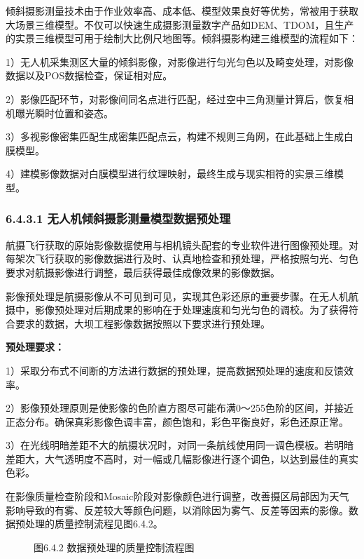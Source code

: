 倾斜摄影测量技术由于作业效率高、成本低、模型效果良好等优势，常被用于获取大场景三维模型。不仅可以快速生成摄影测量数字产品如DEM、TDOM，且生产的实景三维模型可用于绘制大比例尺地图等。倾斜摄影构建三维模型的流程如下：

1）无人机采集测区大量的倾斜影像，对影像进行匀光匀色以及畸变处理，对影像数据以及POS数据检查，保证相对应。

2）影像匹配环节，对影像间同名点进行匹配，经过空中三角测量计算后，恢复相机曝光瞬时位置和姿态。

3）多视影像密集匹配生成密集匹配点云，构建不规则三角网，在此基础上生成白膜模型。

4）建模影像数据对白膜模型进行纹理映射，最终生成与现实相符的实景三维模型。

\subsubsection{6.4.3.1
无人机倾斜摄影测量模型数据预处理}\label{ux65e0ux4ebaux673aux503eux659cux6444ux5f71ux6d4bux91cfux6a21ux578bux6570ux636eux9884ux5904ux7406}

航摄飞行获取的原始影像数据使用与相机镜头配套的专业软件进行图像预处理。对每架次飞行获取的影像数据进行及时、认真地检查和预处理，严格按照匀光、匀色要求对航摄影像进行调整，最后获得最佳成像效果的影像数据。

影像预处理是航摄影像从不可见到可见，实现其色彩还原的重要步骤。在无人机航摄中，影像预处理对后期成果的影响在于处理速度和匀光匀色的调校。为了获得符合要求的数据，大坝工程影像数据按照以下要求进行预处理。

\textbf{预处理要求：}

1）采取分布式不间断的方法进行数据的预处理，提高数据预处理的速度和反馈效率。

2）影像预处理原则是使影像的色阶直方图尽可能布满0～255色阶的区间，并接近正态分布。确保真彩影像色调丰富，颜色饱和，彩色平衡良好，彩色还原正常。

3）在光线明暗差距不大的航摄状况时，对同一条航线使用同一调色模板。若明暗差距大，大气透明度不高时，对一幅或几幅影像进行逐个调色，以达到最佳的真实色彩。

在影像质量检查阶段和Mosaic阶段对影像颜色进行调整，改善摄区局部因为天气影响导致的有雾、反差较大等颜色问题，以消除因为雾气、反差等因素的影像。数据预处理的质量控制流程见图6.4.2。

\begin{figure}
\centering

\caption{图6.4.2 数据预处理的质量控制流程图}
\end{figure}

